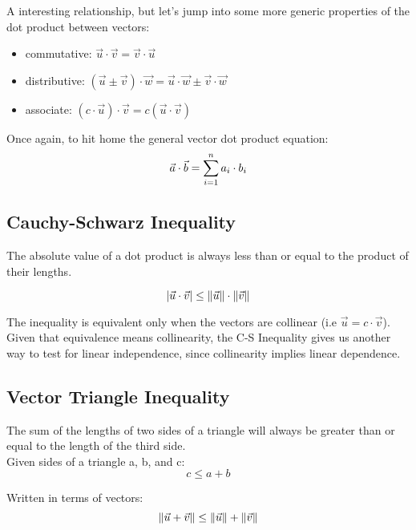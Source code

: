 A interesting relationship, but let's jump into some more generic properties of the dot product between vectors:
\begin{itemize}
	\item commutative: $\vec{u} \cdot \vec{v} = \vec{v} \cdot \vec{u}$
	\item distributive: $(\vec{u} \pm \vec{v}) \cdot \vec{w} = \vec{u} \cdot \vec{w} \pm \vec{v} \cdot \vec{w}$
	\item associate: $(c \cdot \vec{u}) \cdot \vec{v} = c(\vec{u} \cdot \vec{v})$
\end{itemize}

Once again, to hit home the general vector dot product equation: 
\begin{equation}
	\vec{a} \cdot \vec{b} = \sum_{i=1}^{n} a_i \cdot b_i
\end{equation}


\subsection{Cauchy-Schwarz Inequality}\label{concept2.3}
The absolute value of a dot product is always less than or equal to the product of their lengths.

\begin{equation}
	|\vec{u} \cdot \vec{v}| \leq \left\Vert \vec{u} \right\Vert \cdot \left\Vert \vec{v} \right\Vert
\end{equation}

The inequality is equivalent only when the vectors are collinear (i.e $\vec{u} = c \cdot \vec{v}$).
\\

Given that equivalence means collinearity, the C-S Inequality gives us another way to test for linear independence, since collinearity implies linear dependence.
\\


\subsection{Vector Triangle Inequality}\label{concept2.4}
The sum of the lengths of two sides of a triangle will always be greater than or equal to the length of the third side.
\\

Given sides of a triangle a, b, and c:
\begin{equation}
	c \leq a + b
\end{equation}

Written in terms of vectors:
\begin{equation}
	\left\Vert\vec{u} + \vec{v}\right\Vert \leq \left\Vert \vec{u} \right\Vert + \left\Vert \vec{v} \right\Vert
\end{equation}

